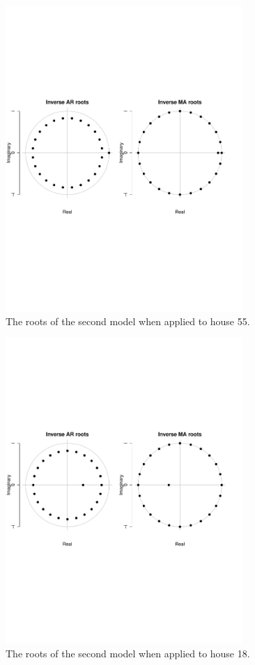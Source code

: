 \begin{figure}
    \centering
    \includegraphics[width=0.8\textwidth]{../../../figures/arimax/Roots_55.pdf}
    \caption{The roots of the second model when applied to house 55.}
    \label{fig:Model2_stationarity55}
\end{figure}


\begin{figure}
    \centering
    \includegraphics[width=0.8\textwidth]{../../../figures/arimax/Roots_18.pdf}
    \caption{The roots of the second model when applied to house 18.}
    \label{fig:Model2_stationarity18}
\end{figure}

